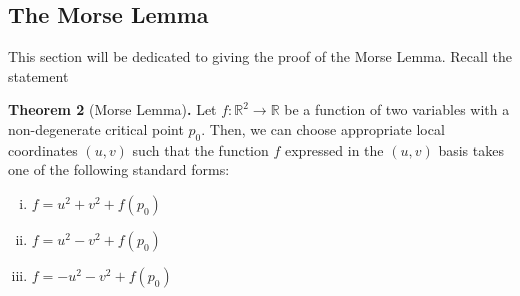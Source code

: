 \documentclass[12pt]{article}
\newcommand{\bR}{{\mathbb R}}
\theoremstyle{definition}
\begin{document}
\subsection{The Morse Lemma}

This section will be dedicated to giving the proof of the Morse Lemma. Recall the statement

\noindent
\textbf{Theorem 2} (Morse Lemma)\textbf{.}
	Let $f:\bR^2 \rightarrow \bR$ be a function of two variables with a non-degenerate critical point $p_0$. Then, we can choose appropriate local coordinates $(u,v)$ such that the function $f$ expressed in the $(u,v)$ basis takes one of the following standard forms:
	\begin{enumerate}[(i)]
		\item $f = u^2+v^2+f(p_0)$
		\item $f = u^2 - v^2 + f(p_0)$
		\item $f = -u^2 -v^2 + f(p_0)$
	\end{enumerate}
\end{document}
